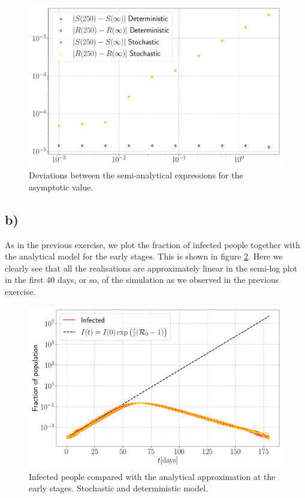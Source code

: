 \begin{figure}[htb]
	\centering
	\includegraphics[width=0.8\columnwidth]{../fig/timestep.pdf}
	\caption{Deviations between the semi-analytical expressions for the asymptotic value.}
	\label{fig:timesteps}
\end{figure}

\subsection{b)}

As in the previous exercise, we plot the fraction of infected people together with the analytical model for the early stages. This is shown in figure \ref{fig:Infected_stoch}. Here we clearly see that all the realisations are approximately linear in the semi-log plot in the first $40$ days, or so, of the simulation as we observed in the previous exercise. 

\begin{figure}[htb]
	\centering
	\includegraphics[width=0.8\columnwidth]{../fig/2Bb_I.pdf}
	\caption{Infected people compared with the analytical approximation at the early stages. Stochastic and deterministic model.}
	\label{fig:Infected_stoch}
\end{figure}

